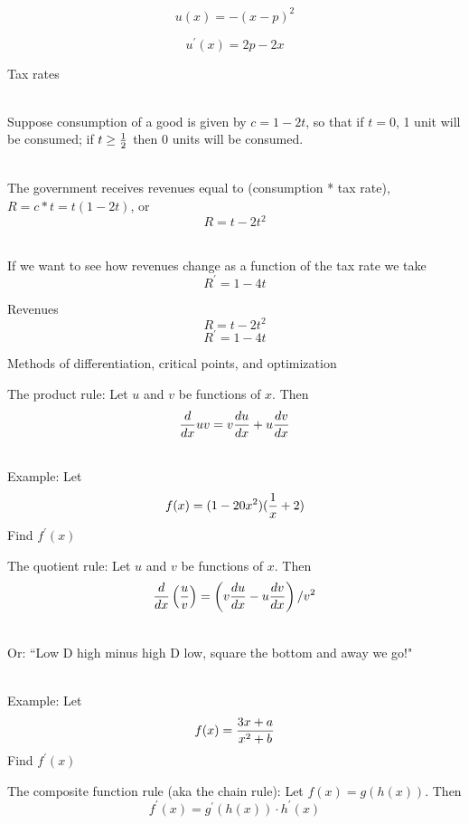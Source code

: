 \documentclass[10pt]{seminar}
\begin{document}
\begin{slide}
\newslide
$$u(x)=-(x-p)^2$$

$$u^\prime(x)=2p-2x$$

\vspace{.5in}
\begin{center}
\end{center}

\newslide

Tax rates

\ \\Suppose consumption of a good is given by $c=1-2t$, so that if $t=0$, 1 unit will be consumed; if $t\geq {1\over 2}$ then 0 units will be consumed.

\ \\The government receives revenues equal to (consumption * tax rate), $R=c*t=t(1-2t)$, or $$R=t-2t^2$$

\ \\If we want to see how revenues change as a function of the tax rate we take $$R^\prime=1-4t$$

\newslide

Revenues $$R=t-2t^2$$ $$R^\prime=1-4t$$

\vspace{.5in}
\begin{center}
\end{center}

\newslide
\begin{center}

Methods of differentiation, critical points, and optimization
 \end{center}
 
 \newslide
The product rule:  Let $u$ and $v$ be functions of $x$.  Then $${d\over{dx}}uv=v{{du}\over{dx}}+u{{dv}\over{dx}}$$

\ \\Example: Let $$f(x)= (1-20x^2)({1\over x}+2)$$ Find $f^\prime(x)$

\newslide
The quotient rule:  Let $u$ and $v$ be functions of $x$.  Then $${d\over{dx}}\left({u\over v}\right)={\left({v{{du}\over{dx}}-u{{dv}\over{dx}}}\right) / {v^2}}$$

\ \\Or: ``Low D high minus high D low, square the bottom and away we go!"

\ \\Example: Let $$f(x)= {{3x+a}\over{x^2+b}}$$ Find $f^\prime(x)$


\newslide
The composite function rule (aka the chain rule): Let $f(x)=g(h(x))$. Then $$f^\prime(x)=g^\prime(h(x))\cdot h^\prime(x)$$



\end{slide}
\end{document}

